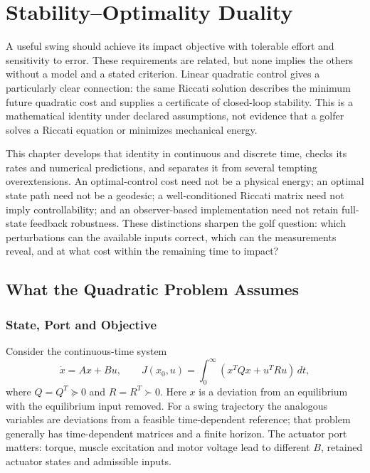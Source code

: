 \chapter{Stability--Optimality Duality}
\label{ch:duality}

A useful swing should achieve its impact objective with tolerable effort and sensitivity to error. These requirements are related, but none implies the others without a model and a stated criterion. Linear quadratic control gives a particularly clear connection: the same Riccati solution describes the minimum future quadratic cost and supplies a certificate of closed-loop stability. This is a mathematical identity under declared assumptions, not evidence that a golfer solves a Riccati equation or minimizes mechanical energy.

This chapter develops that identity in continuous and discrete time, checks its rates and numerical predictions, and separates it from several tempting overextensions. An optimal-control cost need not be a physical energy; an optimal state path need not be a geodesic; a well-conditioned Riccati matrix need not imply controllability; and an observer-based implementation need not retain full-state feedback robustness. These distinctions sharpen the golf question: which perturbations can the available inputs correct, which can the measurements reveal, and at what cost within the remaining time to impact?

\section{What the Quadratic Problem Assumes}

\subsection{State, Port and Objective}

Consider the continuous-time system
\begin{equation}
\dot x=Ax+Bu,\qquad
J(x_0,u)=\int_0^\infty (x^TQx+u^TRu)\,dt,
\end{equation}
where $Q=Q^T\succeq0$ and $R=R^T\succ0$. Here $x$ is a deviation from an equilibrium with the equilibrium input removed. For a swing trajectory the analogous variables are deviations from a feasible time-dependent reference; that problem generally has time-dependent matrices and a finite horizon. The actuator port matters: torque, muscle excitation and motor voltage lead to different $B$, retained actuator states and admissible inputs.

